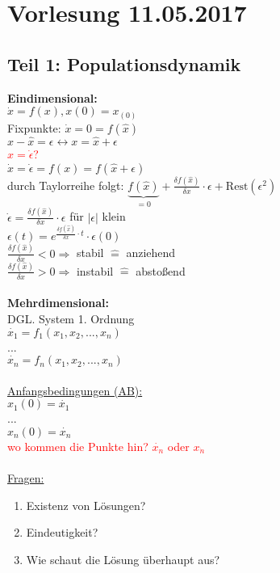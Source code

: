 \section{Vorlesung 11.05.2017}

\subsection{Teil 1: Populationsdynamik}
\textbf{Eindimensional:}\\
$\dot{x}=f(x), x(0)=x_{(0)}$\\
Fixpunkte: $\dot{x}=0=f(\hat{x})$\\

$x-\hat{x}=\epsilon \leftrightarrow x=\hat{x}+\epsilon$\\
\textcolor{red}{$\hat{x}=\dot{\epsilon}$?}\\
$\dot{x}=\dot{\epsilon}=f(x)=f(\hat{x}+\epsilon)$\\
durch Taylorreihe folgt: $\underbrace{f(\hat{x})}_{=0} + \frac{\delta f(\hat{x})}{\delta x} \cdot \epsilon + \text{Rest}(\epsilon^2)$\\
$\dot{\epsilon}=\frac{\delta f(\hat{x})}{\delta x}\cdot \epsilon$ für $|\epsilon|$ klein\\
$\epsilon(t)=e^{\frac{\delta f(\hat{x})}{\delta x}\cdot t} \cdot \epsilon(0)$\\
$\frac{\delta f(\hat{x})}{\delta x} < 0 \Rightarrow$ stabil $\hat{=}$ anziehend\\
$\frac{\delta f(\hat{x})}{\delta x} > 0 \Rightarrow$ instabil $\hat{=}$ abstoßend\\\\

\textbf{Mehrdimensional:}\\
DGL. System 1. Ordnung\\
$\dot{x_1}=f_1(x_1, x_2, ..., x_n)$\\
...\\
$\dot{x_n}=f_n(x_1, x_2, ..., x_n)$\\\\
\underline{Anfangsbedingungen (AB):}\\
$x_1(0)=\dot{x_1}$\\
...\\
$x_n(0)=\dot{x_n}$\\ \textcolor{red}{wo kommen die Punkte hin? $\dot{x_n}$ oder $x_{\dot{n}}$}\\\\

\underline{Fragen:}
\begin{enumerate}
	\item Existenz von Lösungen?
	\item Eindeutigkeit?
	\item Wie schaut die Lösung überhaupt aus?
\end{enumerate}

